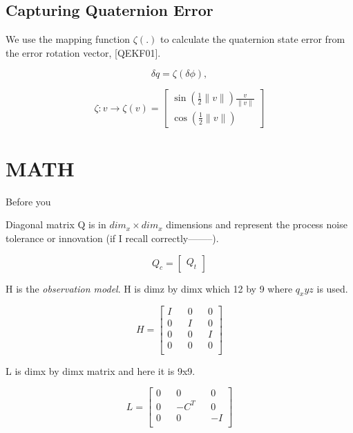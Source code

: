 \documentclass[letterpaper, 10 pt, conference]{ieeeconf}  %
\newcommand{\transpose}[1]{\ensuremath{#1^{\scriptscriptstyle T}}}
\begin{document}
\subsection{Capturing Quaternion Error}
We use the mapping function $\zeta(.)$ to calculate the quaternion
state error from the error rotation vector, [QEKF01].

\begin{equation}
\label{eq:14}
\delta q = \zeta(\delta \phi),
\end{equation}

\begin{equation}
\label{eq:15}
\zeta : v \rightarrow \zeta(v) =
        \begin{bmatrix}
        \sin(\frac{1}{2}\|v\|) \frac{v}{\|v\|} \\
        \cos(\frac{1}{2}\|v\|)
        \end{bmatrix}
\end{equation}



\section{MATH}

Before you


Diagonal matrix Q is in $dim_x \times dim_x$ dimensions and represent the process
noise tolerance or innovation (if I recall correctly--------).

\begin{equation}
Q_{c} =
        \begin{bmatrix}
                Q_{t}
        \end{bmatrix}
\end{equation}

H is the \textit{observation model}.
H is dimz by dimx which 12 by 9 where $q_xyz$ is used.

\begin{equation}
H =
\begin{bmatrix}
        I && 0 && 0  \\
        0 && I && 0  \\
        0 && 0 && I  \\
        0 && 0 && 0  \\
\end{bmatrix}
\end{equation}

L is dimx by dimx matrix and here it is 9x9.

\begin{equation}
L =
\begin{bmatrix}
        0 && 0 && 0  \\
        0 && -\transpose{C} && 0  \\
        0 && 0 && -I  \\
\end{bmatrix}
\end{equation}
\end{document}
